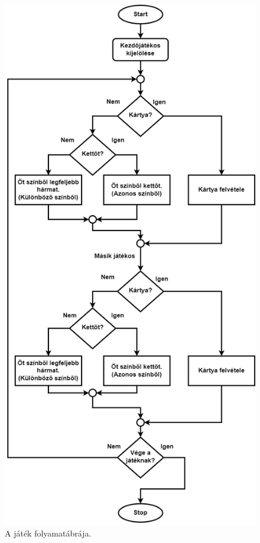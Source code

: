 

\begin{figure}[h]
\centering
\includegraphics[scale=0.3]{images/flowchart.png}
\caption{A játék folyamatábrája.}
\label{fig:flowchart}
\end{figure}


